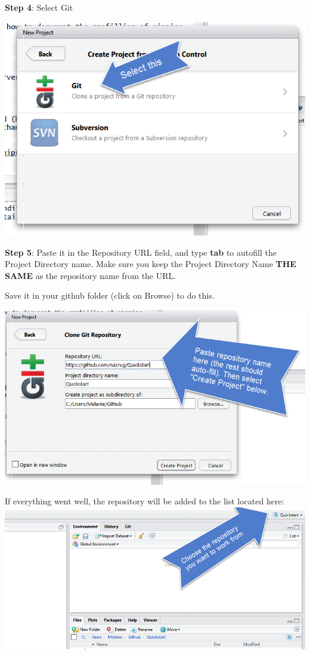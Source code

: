 \documentclass[]{book}
\begin{document}
\textbf{Step 4}: Select Git

\includegraphics{img/new_project_3.png}

\textbf{Step 5}: Paste it in the Repository URL field, and type \textbf{tab} to autofill the Project Directory name. Make sure you keep the Project Directory Name \textbf{THE SAME} as the repository name from the URL.

Save it in your github folder (click on Browse) to do this.

\includegraphics{img/new_project_4.png}

If everything went well, the repository will be added to the list located here:
\includegraphics{img/select_project.png}
\end{document}
